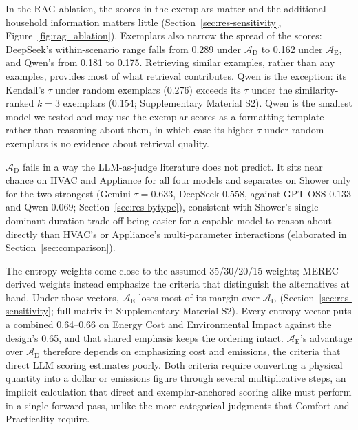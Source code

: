 \documentclass[final,3p,times]{elsarticle}
\begin{document}
In the RAG ablation, the scores in the exemplars matter and the additional household information matters little (Section~\ref{sec:res-sensitivity}, Figure~\ref{fig:rag_ablation}). Exemplars also narrow the spread of the scores: DeepSeek's within-scenario range falls from 0.289 under $\mathcal{A}_{\text{D}}$ to 0.162 under $\mathcal{A}_{\text{E}}$, and Qwen's from 0.181 to 0.175. Retrieving similar examples, rather than any examples, provides most of what retrieval contributes. Qwen is the exception: its Kendall's $\tau$ under random exemplars (0.276) exceeds its $\tau$ under the similarity-ranked $k=3$ exemplars (0.154; Supplementary Material S2). Qwen is the smallest model we tested and may use the exemplar scores as a formatting template rather than reasoning about them, in which case its higher $\tau$ under random exemplars is no evidence about retrieval quality.

$\mathcal{A}_{\text{D}}$ fails in a way the LLM-as-judge literature does not predict. It sits near chance on HVAC and Appliance for all four models and separates on Shower only for the two strongest (Gemini $\tau = 0.633$, DeepSeek $0.558$, against GPT-OSS $0.133$ and Qwen $0.069$; Section~\ref{sec:res-bytype}), consistent with Shower's single dominant duration trade-off being easier for a capable model to reason about directly than HVAC's or Appliance's multi-parameter interactions (elaborated in Section~\ref{sec:comparison}).

The entropy weights come close to the assumed 35/30/20/15 weights; MEREC-derived weights instead emphasize the criteria that distinguish the alternatives at hand. Under those vectors, $\mathcal{A}_{\text{E}}$ loses most of its margin over $\mathcal{A}_{\text{D}}$ (Section~\ref{sec:res-sensitivity}; full matrix in Supplementary Material S2). Every entropy vector puts a combined 0.64--0.66 on Energy Cost and Environmental Impact against the design's 0.65, and that shared emphasis keeps the ordering intact. $\mathcal{A}_{\text{E}}$'s advantage over $\mathcal{A}_{\text{D}}$ therefore depends on emphasizing cost and emissions, the criteria that direct LLM scoring estimates poorly. Both criteria require converting a physical quantity into a dollar or emissions figure through several multiplicative steps, an implicit calculation that direct and exemplar-anchored scoring alike must perform in a single forward pass, unlike the more categorical judgments that Comfort and Practicality require.
\end{document}

